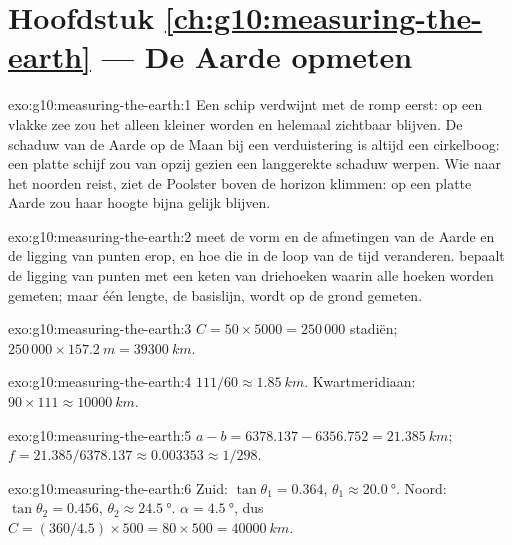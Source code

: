 \section*{Hoofdstuk \ref{ch:g10:measuring-the-earth} --- De Aarde opmeten}

\begin{solution}{exo:g10:measuring-the-earth:1}
Een schip verdwijnt met de romp eerst: op een vlakke zee zou het alleen
kleiner worden en helemaal zichtbaar blijven. De schaduw van de Aarde op de
Maan bij een verduistering is altijd een cirkelboog: een platte schijf zou van
opzij gezien een langgerekte schaduw werpen. Wie naar het noorden reist, ziet de
Poolster boven de horizon klimmen: op een platte Aarde zou haar hoogte bijna
gelijk blijven.
\end{solution}

\begin{solution}{exo:g10:measuring-the-earth:2}
 meet de vorm en de afmetingen van de Aarde en de ligging van punten
erop, en hoe die in de loop van de tijd veranderen.  bepaalt de
ligging van punten met een keten van driehoeken waarin alle hoeken worden
gemeten; maar één lengte, de basislijn, wordt op de grond gemeten.
\end{solution}

\begin{solution}{exo:g10:measuring-the-earth:3}
$C = 50 \times 5000 = 250\,000$ stadiën; $250\,000 \times \qty{157.2}{m} =
\qty{39300}{km}$.
\end{solution}

\begin{solution}{exo:g10:measuring-the-earth:4}
$111/60 \approx \qty{1.85}{km}$. Kwartmeridiaan: $90 \times 111 \approx
\qty{10000}{km}$.
\end{solution}

\begin{solution}{exo:g10:measuring-the-earth:5}
$a - b = 6378.137 - 6356.752 = \qty{21.385}{km}$;
$f = 21.385/6378.137 \approx 0.003353 \approx 1/298$.
\end{solution}

\begin{solution}{exo:g10:measuring-the-earth:6}
Zuid: $\tan\theta_1 = 0.364$, $\theta_1 \approx \qty{20.0}{\degree}$. Noord:
$\tan\theta_2 = 0.456$, $\theta_2 \approx \qty{24.5}{\degree}$.
$\alpha = \qty{4.5}{\degree}$, dus $C = (360/4.5) \times 500 = 80 \times 500 =
\qty{40000}{km}$.
\end{solution}

